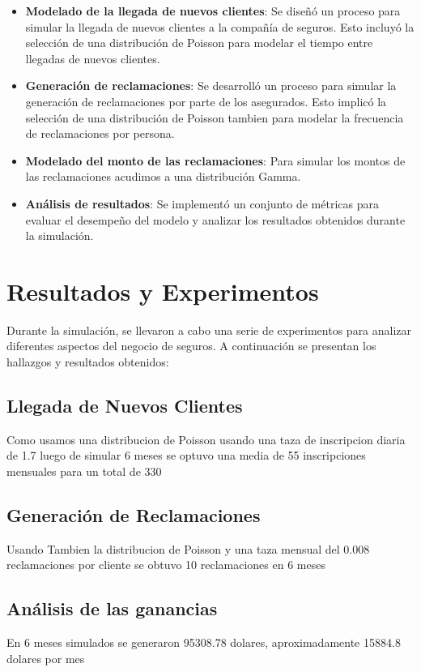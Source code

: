 \documentclass{article}
\begin{document}
\begin{itemize}
  \item \textbf{Modelado de la llegada de nuevos clientes}: Se diseñó un proceso para simular la llegada de nuevos clientes a la compañía de seguros. Esto incluyó la selección de una distribución de Poisson para modelar el tiempo entre llegadas de nuevos clientes.
  \item \textbf{Generación de reclamaciones}: Se desarrolló un proceso para simular la generación de reclamaciones por parte de los asegurados. Esto implicó la selección de una distribución de Poisson tambien para modelar la frecuencia de reclamaciones por persona.
  \item \textbf{Modelado del monto de las reclamaciones}: Para simular los montos de las reclamaciones acudimos a una distribución Gamma.
  \item \textbf{Análisis de resultados}: Se implementó un conjunto de métricas para evaluar el desempeño del modelo y analizar los resultados obtenidos durante la simulación.
\end{itemize}

\section{Resultados y Experimentos}
Durante la simulación, se llevaron a cabo una serie de experimentos para analizar diferentes aspectos del negocio de seguros. A continuación se presentan los hallazgos y resultados obtenidos:

\subsection{Llegada de Nuevos Clientes}
Como usamos una distribucion de Poisson usando una taza de inscripcion diaria de 1.7 luego de simular 6 meses se optuvo una media de 55 inscripciones mensuales para un total de 330

\subsection{Generación de Reclamaciones}
Usando Tambien la distribucion de Poisson y una taza mensual del 0.008 reclamaciones por cliente se obtuvo 10 reclamaciones en 6 meses

\subsection{An\'{a}lisis de las ganancias}
En 6 meses simulados se generaron 95308.78 dolares, aproximadamente 15884.8 dolares por mes
\end{document}
